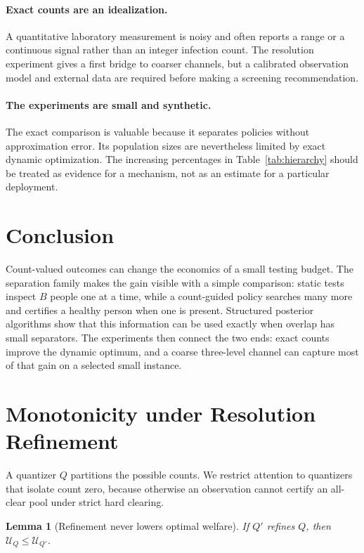 \documentclass[11pt]{article}
\newtheorem{lemma}{Lemma}
\begin{document}
\paragraph{Exact counts are an idealization.}
A quantitative laboratory measurement is noisy and often reports a range or a
continuous signal rather than an integer infection count. The resolution
experiment gives a first bridge to coarser channels, but a calibrated observation
model and external data are required before making a screening recommendation.

\paragraph{The experiments are small and synthetic.}
The exact comparison is valuable because it separates policies without
approximation error. Its population sizes are nevertheless limited by exact
dynamic optimization. The increasing percentages in Table~\ref{tab:hierarchy}
should be treated as evidence for a mechanism, not as an estimate for a
particular deployment.

\section{Conclusion}

Count-valued outcomes can change the economics of a small testing budget. The
separation family makes the gain visible with a simple comparison: static tests
inspect $B$ people one at a time, while a count-guided policy searches many more
and certifies a healthy person when one is present. Structured posterior
algorithms show that this information can be used exactly when overlap has small
separators. The experiments then connect the two ends: exact counts improve the
dynamic optimum, and a coarse three-level channel can capture most of that gain
on a selected small instance.

\appendix

\section{Monotonicity under Resolution Refinement}
\label{app:resolution}

A quantizer $Q$ partitions the possible counts. We restrict attention to
quantizers that isolate count zero, because otherwise an observation cannot
certify an all-clear pool under strict hard clearing.

\begin{lemma}[Refinement never lowers optimal welfare]
If $Q'$ refines $Q$, then $\mathcal U_Q\leq\mathcal U_{Q'}$.
\end{lemma}
\end{document}
